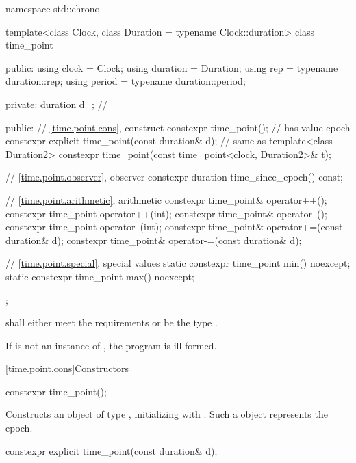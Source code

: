%
\begin{codeblock}
namespace std::chrono {
  template<class Clock, class Duration = typename Clock::duration>
  class time_point {
  public:
    using clock    = Clock;
    using duration = Duration;
    using rep      = typename duration::rep;
    using period   = typename duration::period;

  private:
    duration d_;                                                // \expos

  public:
    // \ref{time.point.cons}, construct
    constexpr time_point();                                     // has value epoch
    constexpr explicit time_point(const duration& d);           // same as 
    template<class Duration2>
      constexpr time_point(const time_point<clock, Duration2>& t);

    // \ref{time.point.observer}, observer
    constexpr duration time_since_epoch() const;

    // \ref{time.point.arithmetic}, arithmetic
    constexpr time_point& operator++();
    constexpr time_point operator++(int);
    constexpr time_point& operator--();
    constexpr time_point operator--(int);
    constexpr time_point& operator+=(const duration& d);
    constexpr time_point& operator-=(const duration& d);

    // \ref{time.point.special}, special values
    static constexpr time_point min() noexcept;
    static constexpr time_point max() noexcept;
  };
}
\end{codeblock}

\pnum
{} shall either
meet the  requirements
or be the type .

\pnum
If  is not an instance of ,
the program is ill-formed.

[time.point.cons]{Constructors}

%
\begin{itemdecl}
constexpr time_point();
\end{itemdecl}

\begin{itemdescr}
\pnum
\effects
Constructs an object of type , initializing
 with . Such a  object
represents the epoch.
\end{itemdescr}

%
\begin{itemdecl}
constexpr explicit time_point(const duration& d);
\end{itemdecl}


